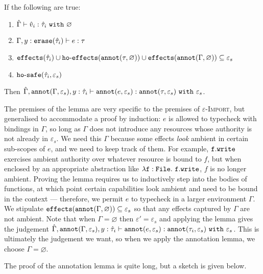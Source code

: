 \begin{lemma}
If the following are true:

\begin{enumerate}
	\setlength\itemsep{-0.7em}
	\item $\hat \Gamma \vdash \hat v_i : \hat \tau_i~\mathtt{with}~ \varnothing$
	\item $\Gamma, y: \mathtt{erase}(\hat \tau_i) \vdash e: \tau$
	\item $\mathtt{effects}(\hat \tau_i) \cup \mathtt{ho \hbox{-} effects}(\mathtt{annot}(\tau, \varnothing)) \cup \mathtt{effects}(\mathtt{annot}(\Gamma, \varnothing)) \subseteq \varepsilon_{s}$
	\item $\mathtt{ho \hbox{-} safe}(\hat \tau_i, \varepsilon_s)$
\end{enumerate}

\noindent
Then $\hat \Gamma, \mathtt{annot}(\Gamma, \varepsilon_s), y: \hat \tau_i \vdash \mathtt{annot}(e, \varepsilon_s) : \mathtt{annot}(\tau, \varepsilon_s)~\mathtt{with}~ \varepsilon_s$.
\end{lemma}


The premises of the lemma are very specific to the premises of \textsc{$\varepsilon$-Import}, but generalised to accommodate a proof by induction: $e$ is allowed to typecheck with bindings in $\Gamma$, so long as $\Gamma$ does not introduce any resources whose authority is not already in $\varepsilon_s$. We need this $\Gamma$ because some effects \textit{look} ambient in certain sub-scopes of $e$, and we need to keep track of them. For example, $\mathtt{f.write}$ exercises ambient authority over whatever resource is bound to $f$, but when enclosed by an appropriate abstraction like $\mathtt{\lambda f: {File}.~f.write}$, $f$ is no longer ambient. Proving the lemma requires us to inductively step into the bodies of functions, at which point certain capabilities look ambient and need to be bound in the context --- therefore, we permit $e$ to typecheck in a larger environment $\Gamma$. We stipulate $\mathtt{effects}(\mathtt{annot}(\Gamma, \varnothing)) \subseteq \varepsilon_s$ so that any effects captured by $\Gamma$ are not ambient. Note that when $\Gamma = \varnothing$ then $\varepsilon' = \varepsilon_s$ and applying the lemma gives the judgement $\hat \Gamma, \mathtt{annot}(\Gamma, \varepsilon_s), y: \hat \tau_i \vdash \mathtt{annot}(e, \varepsilon_s) : \mathtt{annot}(\tau_i, \varepsilon_s)~\mathtt{with}~ \varepsilon_s$. This is ultimately the judgement we want, so when we apply the annotation lemma, we choose $\Gamma = \varnothing$.

The proof of the annotation lemma is quite long, but a sketch is given below.

